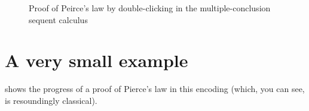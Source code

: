 \begin{figure}
\qquad
\caption{Proof of Peirce's law by double-clicking in the multiple-conclusion sequent calculus}
\label{fig:peirce}
\end{figure}


\section{A very small example}

 shows the progress of a proof of Pierce's law in this encoding (which, you can see, is resoundingly classical).
